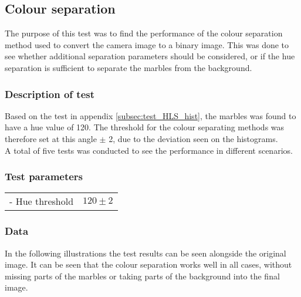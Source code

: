 \documentclass[../Head/Main.tex]{subfiles}
\begin{document}
\subsection{Colour separation}
\label{subsec:test_colour_separation}
The purpose of this test was to find the performance of the colour separation method used to convert the camera image to a binary image. This was done to see whether additional separation parameters should be considered, or if the hue separation is sufficient to separate the marbles from the background.
\subsubsection{Description of test}
Based on the test in appendix \ref{subsec:test_HLS_hist}, the marbles was found to have a hue value of 120. The threshold for the colour separating methods was therefore set at this angle $\pm$ 2, due to the deviation seen on the histograms.\\
A total of five tests was conducted to see the performance in different scenarios. 

\subsubsection{Test parameters}
\begin{minipage}[c]{0.35\textwidth}
	\begin{tabular}{l r}
	- Hue threshold                   & $120\pm 2$\\
	\end{tabular}
\end{minipage}	

\subsubsection{Data}
In the following illustrations the test results can be seen alongside the original image. It can be seen that the colour separation works well in all cases, without missing parts of the marbles or taking parts of the background into the final image.
\end{document}
